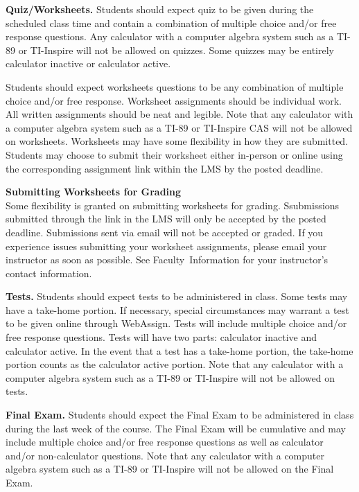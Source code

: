 \documentclass{article}
\renewenvironment{framed}[1][]{%
  \def\FrameCommand{%
    \hspace{1pt}%
    {\color{mybordercolor}\vrule width 2pt} %
    \hspace{1pt}%
    \fboxsep=\FrameSep%
    \colorbox{mybgcolor}%
  }%
  \MakeFramed {\advance\hsize-\width \FrameRestore}%
}{%
  \endMakeFramed
}
\begin{document}
\textbf{Quiz/Worksheets.} Students should expect quiz to be given during the scheduled class time and contain a combination of multiple choice and/or free response questions. Any calculator with a computer algebra system such as a TI-89 or TI-Inspire will not be allowed on quizzes. Some quizzes may be entirely calculator inactive or calculator active.

Students should expect worksheets questions to be any combination of multiple choice and/or free response. Worksheet assignments should be individual work. All written assignments should be neat and legible. Note that any calculator with a computer algebra system such as a TI-89 or TI-Inspire CAS will not be allowed on worksheets. Worksheets may have some flexibility in how they are submitted. Students may choose to submit their worksheet either in-person or online using the corresponding assignment link within the LMS by the posted deadline.

\begin{framed}
\textbf{Submitting Worksheets for Grading}\\
Some flexibility is granted on submitting worksheets for grading. Ssubmissions submitted through the link in the LMS will only be accepted by the posted deadline. Submissions sent via email will not be accepted or graded. If you experience issues submitting your worksheet assignments, please email your instructor as soon as possible. See Faculty~Information for your instructor's contact information.
\end{framed}

\textbf{Tests.} Students should expect tests to be administered in class. Some tests may have a take-home portion. If necessary, special circumstances may warrant a test to be given online through WebAssign. Tests will include multiple choice and/or free response questions. Tests will have two parts: calculator inactive and calculator active. In the event that a test has a take-home portion, the take-home portion counts as the calculator active portion. Note that any calculator with a computer algebra system such as a TI-89 or TI-Inspire will not be allowed on tests.

\textbf{Final Exam.} Students should expect the Final Exam to be administered in class during the last week of the course. The Final Exam will be cumulative and may include multiple choice and/or free response questions as well as calculator and/or non-calculator questions. Note that any calculator with a computer algebra system such as a TI-89 or TI-Inspire will not be allowed on the Final Exam.
\end{document}
